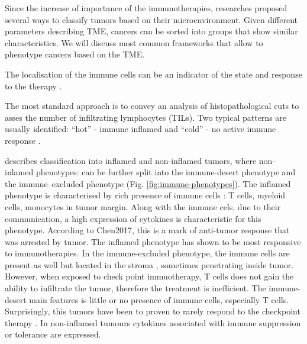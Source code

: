 \documentclass[12pt,]{book}
\theoremstyle{definition}
\theoremstyle{definition}
\theoremstyle{definition}
\theoremstyle{remark}
\begin{document}
Since the increase of importance of the immunotherapies, researches
proposed several ways to classify tumors based on their
microenvironment. Given different parameters describing TME, cancers can
be sorted into groups that show similar characteristics. We will discuss
most common frameworks that allow to phenotype cancers based on the TME.

The localisation of the immune cells can be an indicator of the state
and response to the therapy \citep{Bindea2013}.

The most standard approach is to convey an analysis of histopathological
cuts to asses the number of infiltrating lymphocytes (TILs). Two typical
patterns are usually identified: ``hot'' - immune inflamed and ``cold''
- no active immune response \citep{Berghoff2018}.

\citet{Chen2017} describes classification into inflamed and non-inflamed
tumors, where non-inlamed phenotypes: can be further split into the
immune-desert phenotype and the immune--excluded phenotype (Fig.
\ref{fig:immune-phenotypes}). The inflamed phenotype is characterised by
rich presence of immune cells : T cells, myeloid cells, monocytes in
tumor margin. Along with the immune cels, due to their communication, a
high expression of cytokines is characteristic for this phenotype.
According to Chen2017, this is a mark of anti-tumor response that was
arrested by tumor. The inflamed phenotype has shown to be most
responsive to immunotherapies. In the immune-excluded phenotype, the
immune cells are present as well but located in the stroma
\citep{Herbst2014}, sometimes penetrating inside tumor. However, when
exposed to check point immuotherapy, T cells does not gain the ability
to infiltrate the tumor, therefore the treatment is inefficient. The
immune-desert main features is little or no presence of immune cells,
especially T cells. Surprisingly, this tumors have been to proven to
rarely respond to the checkpoint therapy \citep{Herbst2014}. In
non-inflamed tumours cytokines associated with immune suppression or
tolerance are expressed.
\end{document}

